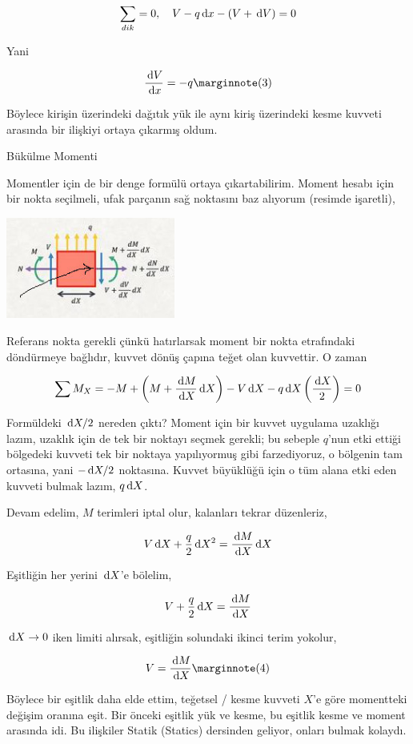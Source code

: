 \documentclass[12pt,fleqn]{article}\usepackage{../../common}
\begin{document}
$$
\sum_{dik} = 0, \quad V - q \,\mathrm{d} x - (V + \,\mathrm{d} V) = 0
$$

Yani

$$
\frac{\ud V}{\ud x} = -q
\mlabel{3}
$$

Böylece kirişin üzerindeki dağıtık yük ile aynı kiriş üzerindeki kesme
kuvveti arasında bir ilişkiyi ortaya çıkarmış oldum. 

Bükülme Momenti

Momentler için de bir denge formülü ortaya çıkartabilirim. Moment hesabı için
bir nokta seçilmeli, ufak parçanın sağ noktasını baz alıyorum (resimde
işaretli),

\includegraphics[width=15em]{phy_020_strs_02_11.jpg}

Referans nokta gerekli çünkü hatırlarsak moment bir nokta etrafındaki
döndürmeye bağlıdır, kuvvet dönüş çapına teğet olan kuvvettir. O zaman 

$$
\sum M_{X} = -M + \left( M + \frac{\,\mathrm{d} M}{\,\mathrm{d} X} \,\mathrm{d} X \right) -
V \,\mathrm{d} X - q \,\mathrm{d} X \left( \frac{\,\mathrm{d} X}{2}  \right) = 0
$$

Formüldeki $\,\mathrm{d} X / 2$ nereden çıktı? Moment için bir kuvvet uygulama uzaklığı
lazım, uzaklık için de tek bir noktayı seçmek gerekli; bu sebeple $q$'nun etki
ettiği bölgedeki kuvveti tek bir noktaya yapılıyormuş gibi farzediyoruz, o
bölgenin tam ortasına, yani $- \,\mathrm{d} X / 2$ noktasına.  Kuvvet büyüklüğü için o
tüm alana etki eden kuvveti bulmak lazım, $q \,\mathrm{d} X$.

Devam edelim, $M$ terimleri iptal olur, kalanları tekrar düzenleriz,

$$
V \,\mathrm{d} X + \frac{q}{2} \,\mathrm{d} X^2 = \frac{\,\mathrm{d} M}{\,\mathrm{d} X} \,\mathrm{d} X
$$

Eşitliğin her yerini $\,\mathrm{d} X$'e bölelim,

$$
V + \frac{q}{2} \,\mathrm{d} X = \frac{\,\mathrm{d} M}{\,\mathrm{d} X} 
$$

$\,\mathrm{d} X \to 0$ iken limiti alırsak, eşitliğin solundaki ikinci terim yokolur,

$$
V = \frac{\ud M}{\ud X}
\mlabel{4}
$$

Böylece bir eşitlik daha elde ettim, teğetsel / kesme kuvveti $X$'e göre
momentteki değişim oranına eşit. Bir önceki eşitlik yük ve kesme, bu eşitlik
kesme ve moment arasında idi. Bu ilişkiler Statik (Statics) dersinden
geliyor, onları bulmak kolaydı.
\end{document}

